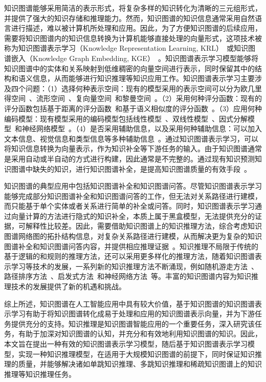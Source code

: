 \documentclass[algorithmlist, AutoFakeBold, AutoFakeSlant, figurelist, tablelist, nomlist, masters]{seuthesix}
\begin{document}
知识图谱能够采用简洁的表示形式，将复杂多样的知识转化为清晰的三元组形式，并提供了强大的知识存储和推理能力。然而，知识图谱的知识信息通常采用自然语言进行描述，难以被计算机所处理和应用。因此，为了方便知识图谱的后续应用，需要将知识图谱内的知识信息转换为计算机能够直接处理的向量形式，这项技术被称为知识图谱表示学习（Knowledge Representation Learning, KRL）~\cite{chen2022rlpath}或知识图谱嵌入（Knowledge Graph Embedding, KGE）~\cite{wang2021transet}。知识图谱表示学习模型能够将知识图谱中的实体和关系映射到低维稠密的向量空间进行表示，同时保留其中的结构和语义信息，从而能够进行知识推理等知识应用工作。知识图谱表示学习主要涉及四个问题：（1）选择何种表示空间：现有的模型采用的表示空间可以分为欧几里得空间~\cite{lu2022dense}、流形空间~\cite{ebisu2018toruse}、复向量空间~\cite{trouillon2016complex}和黎曼空间~\cite{pan2021hyperbolic}。（2）采用何种评分函数：现有的评分函数包括基于距离的评分函数~\cite{sachan2020knowledge}和基于语义相似度的评分函数~\cite{xiao2017ssp}。（3）应用何种编码模型：现有模型采用的编码模型包括线性模型~\cite{peng2020lineare}、双线性模型~\cite{pan2021hyperbolic}、因式分解模型~\cite{ji2015knowledge}和神经网络模型~\cite{jiang2021kernel}。（4）是否采用辅助信息，以及采用何种辅助信息：可以加入文本信息、视觉信息和类型信息等多种辅助信息~\cite{wang2017knowledge}。通过知识图谱表示学习，可以将知识信息转换为向量表示，作为知识补全等下游任务的输入。由于知识图谱通常是采用自动或半自动的方式进行构建，因此通常是不完整的。通过现有知识预测知识图谱中缺失的知识，进行知识图谱补全，是提高知识图谱质量的有效手段~\cite{vu2019capsule}。

知识图谱的典型应用中包括知识图谱补全和知识图谱问答。尽管知识图谱表示学习能够完成部分知识图谱补全和知识图谱问答的工作，但无法对关系路径进行建模，而只能基于单个实体或者关系进行简单的补全或问答。同时，知识图谱表示学习通过向量计算的方法进行隐式的知识补全，本质上属于黑盒模型，无法提供充分的证据，可解释性比较差。因此，需要借助知识图谱上的知识推理方法，综合考虑知识图谱网络图的拓扑结构信息，对复杂关系路径进行建模，从而解决更为复杂的知识图谱补全和知识图谱问答内容，并提供相应推理证据~\cite{chen2020review}。知识推理不局限于传统的基于逻辑的和规则的推理方法，还可以采用更多样化的推理方法，随着知识图谱表示学习等技术的发展，一系列新的知识推理方法不断涌现，例如随机游走方法~\cite{jagvaral2020path}、路径排序方法~\cite{zhao2021target}、启发式方法~\cite{he2021heuristic}和神经网络方法~\cite{wang2018deep}等。丰富的知识图谱内容为知识推理技术的发展提供了新的机遇和挑战。

综上所述，知识图谱在人工智能应用中具有较大价值，基于知识图谱的知识图谱表示学习有助于将知识图谱转化成易于处理和应用的知识图谱表示向量，并为下游任务提供充分的支持。知识推理是知识图谱智能应用的一个重要任务，深入研究该任务，有助于加深对知识图谱的认知，并充分和有效地利用知识图谱的知识。因此，本文旨在提出一种有效的知识图谱表示学习模型，随后基于知识图谱表示学习模型，实现一种知识推理模型，在适用于大规模知识图谱的前提下，同时保证知识推理的质量，并能够解决诸如单跳知识推理、多跳知识推理和稀疏知识图谱上的知识推理等知识推理任务。
\end{document}
